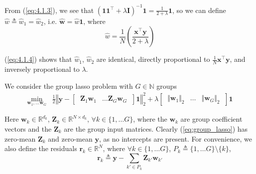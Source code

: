 \documentclass{article}
\numberwithin{equation}{section}
\begin{document}
From (\ref{eq:4.1.3}), we see that $ \left(\mathbf{11}^\top +
\lambda\mathbf{I}\right)^{-1}\mathbf{1} = \frac{1}{2 + \lambda}\mathbf{1} $,
so we can define $ \hat{w} \triangleq \hat{w}_1 = \hat{w}_2 $, i.e.
$ \hat{\mathbf{w}} = \hat{w}\mathbf{1} $, where
\begin{equation} \label{eq:4.1.4}
    \hat{w} =
    \frac{1}{N}\left(\frac{\mathbf{x}^\top\mathbf{y}}{2 + \lambda}\right)
\end{equation}

(\ref{eq:4.1.4}) shows that $ \hat{w}_1 $, $ \hat{w}_2 $ are identical,
directly proportional to $ \frac{1}{N}\mathbf{x}^\top\mathbf{y} $, and
inversely proportional to $ \lambda $.


We consider the group lasso problem with $ G \in \mathbb{N} $ groups
\begin{equation} \label{eq:group_lasso}
    \begin{array}{rl}
        \displaystyle\min_{\mathbf{w}_1, \ldots \mathbf{w}_G} &
        \frac{1}{2}
        \left\Vert
            \mathbf{y} -
            \begin{bmatrix}
                \ \mathbf{Z}_1\mathbf{w}_1 & \ldots \mathbf{Z}_G\mathbf{w}_G \
            \end{bmatrix}
            \mathbf{1}
        \right\Vert_2^2 +
        \lambda
        \begin{bmatrix}
            \ \Vert\mathbf{w}_1\Vert_2 & \ldots & \Vert\mathbf{w}_G\Vert_2 \
        \end{bmatrix}
        \mathbf{1}
    \end{array}
\end{equation}

Here $ \mathbf{w}_k \in \mathbb{R}^{d_k} $, $ \mathbf{Z}_k \in
\mathbb{R}^{N \times d_k} $, $ \forall k \in \{1, \ldots G\} $, where the
$ \mathbf{w}_k $ are group coefficient vectors and the $ \mathbf{Z}_k $ are
the group input matrices. Clearly (\ref{eq:group_lasso}) has zero-mean
$ \mathbf{Z}_k $ and zero-mean $ \mathbf{y} $, as no intercepts are present.
For convenience, we also define the residuals $ \mathbf{r}_k \in
\mathbb{R}^N $, where $ \forall k \in \{1, \ldots G\} $, $ P_k \triangleq
\{1, \ldots G\} \setminus \{k\} $,
\begin{equation} \label{eq:group_lasso_resids}
    \mathbf{r}_k \triangleq
    \mathbf{y} - \sum_{k' \in P_k}\mathbf{Z}_{k'}\mathbf{w}_{k'}
\end{equation}
\end{document}

